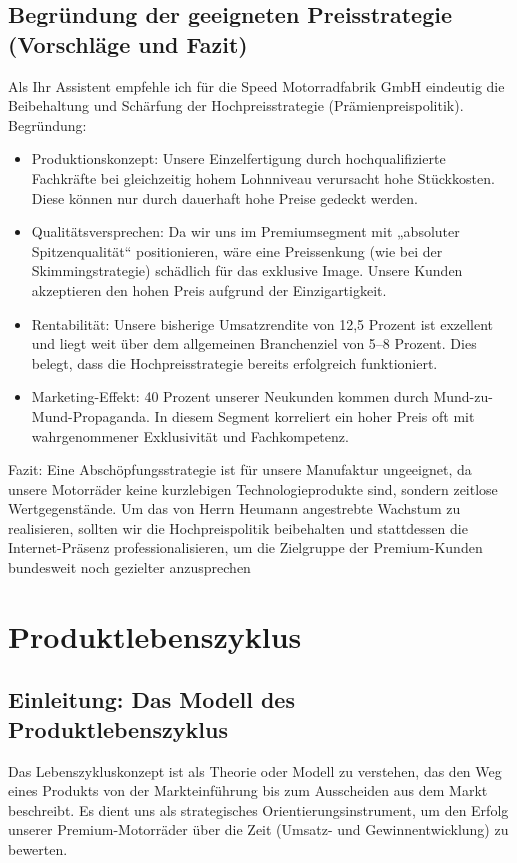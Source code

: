 \documentclass[12pt, a4paper]{article}
\begin{document}
\subsection{Begründung der geeigneten Preisstrategie (Vorschläge und Fazit)}
Als Ihr Assistent empfehle ich für die Speed Motorradfabrik GmbH eindeutig die Beibehaltung und Schärfung der Hochpreisstrategie (Prämienpreispolitik).
Begründung:
\begin{itemize}
    \item Produktionskonzept: Unsere Einzelfertigung durch hochqualifizierte Fachkräfte bei gleichzeitig hohem Lohnniveau verursacht hohe Stückkosten. Diese können nur durch dauerhaft hohe Preise gedeckt werden.
    \item Qualitätsversprechen: Da wir uns im Premiumsegment mit „absoluter Spitzenqualität“ positionieren, wäre eine Preissenkung (wie bei der Skimmingstrategie) schädlich für das exklusive Image. Unsere Kunden akzeptieren den hohen Preis aufgrund der Einzigartigkeit.
    \item Rentabilität: Unsere bisherige Umsatzrendite von 12,5 Prozent ist exzellent und liegt weit über dem allgemeinen Branchenziel von 5–8 Prozent. Dies belegt, dass die Hochpreisstrategie bereits erfolgreich funktioniert.
    \item Marketing-Effekt: 40 Prozent unserer Neukunden kommen durch Mund-zu-Mund-Propaganda. In diesem Segment korreliert ein hoher Preis oft mit wahrgenommener Exklusivität und Fachkompetenz.
\end{itemize}

Fazit: Eine Abschöpfungsstrategie ist für unsere Manufaktur ungeeignet, da unsere Motorräder 
keine kurzlebigen Technologieprodukte sind, sondern zeitlose Wertgegenstände. Um das von 
Herrn Heumann angestrebte Wachstum zu realisieren, sollten wir die Hochpreispolitik beibehalten 
und stattdessen die Internet-Präsenz professionalisieren, um die Zielgruppe der Premium-Kunden bundesweit noch gezielter anzusprechen
\newpage

\section{Produktlebenszyklus}
\subsection{Einleitung: Das Modell des Produktlebenszyklus}
Das Lebenszykluskonzept ist als Theorie oder Modell zu verstehen, das den Weg eines 
Produkts von der Markteinführung bis zum Ausscheiden aus dem Markt beschreibt. 
Es dient uns als strategisches Orientierungsinstrument, um den Erfolg 
unserer Premium-Motorräder über die Zeit (Umsatz- und Gewinnentwicklung) zu bewerten.
\end{document}
